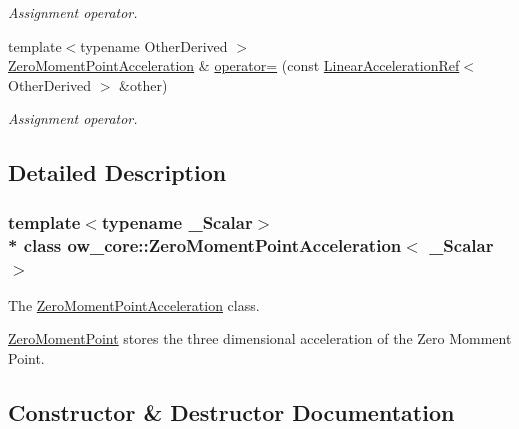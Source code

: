 \begin{DoxyCompactItemize}
\begin{DoxyCompactList}\small\item\em Assignment operator. \end{DoxyCompactList}\item 
{\footnotesize template$<$typename Other\+Derived $>$ }\\\hyperlink{classow__core_1_1ZeroMomentPointAcceleration}{Zero\+Moment\+Point\+Acceleration} \& \hyperlink{classow__core_1_1ZeroMomentPointAcceleration_a79aabd12647b63b65b965c12372c9c9a}{operator=} (const \hyperlink{classow__core_1_1LinearAccelerationRef}{Linear\+Acceleration\+Ref}$<$ Other\+Derived $>$ \&other)\hypertarget{classow__core_1_1ZeroMomentPointAcceleration_a79aabd12647b63b65b965c12372c9c9a}{}\label{classow__core_1_1ZeroMomentPointAcceleration_a79aabd12647b63b65b965c12372c9c9a}

\begin{DoxyCompactList}\small\item\em Assignment operator. \end{DoxyCompactList}\end{DoxyCompactItemize}


\subsection{Detailed Description}
\subsubsection*{template$<$typename \+\_\+\+Scalar$>$\\*
class ow\+\_\+core\+::\+Zero\+Moment\+Point\+Acceleration$<$ \+\_\+\+Scalar $>$}

The \hyperlink{classow__core_1_1ZeroMomentPointAcceleration}{Zero\+Moment\+Point\+Acceleration} class. 

\hyperlink{classow__core_1_1ZeroMomentPoint}{Zero\+Moment\+Point} stores the three dimensional acceleration of the Zero Momment Point. 

\subsection{Constructor \& Destructor Documentation}

